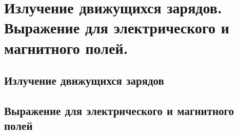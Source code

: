 \chapter{Излучение движущихся зарядов. Выражение для электрического и 
магнитного полей.}

\section{Излучение движущихся зарядов}
\section{Выражение для электрического и магнитного полей}
